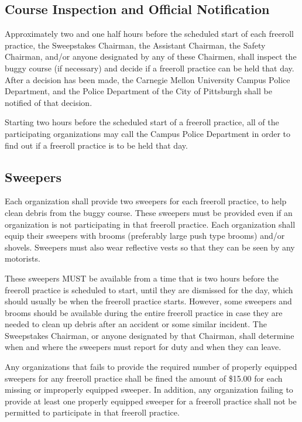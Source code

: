 \subsection{Course Inspection and Official Notification}

Approximately two and one half hours before the scheduled start of each freeroll practice, the Sweepstakes Chairman, the Assistant Chairman, the Safety Chairman, and/or anyone designated by any of these Chairmen, shall inspect the buggy course (if necessary) and decide if a freeroll practice can be held that day. After a decision has been made, the Carnegie Mellon University Campus Police Department, and the Police Department of the City of Pittsburgh shall be notified of that decision.

Starting two hours before the scheduled start of a freeroll practice, all of the participating organizations may call the Campus Police Department in order to find out if a freeroll practice is to be held that day.

\subsection{Sweepers}

Each organization shall provide two sweepers for each freeroll practice, to help clean debris from the buggy course. These sweepers must be provided even if an organization is not participating in that freeroll practice. Each organization shall equip their sweepers with brooms (preferably large push type brooms) and/or shovels. Sweepers must also wear reflective vests so that they can be seen by any motorists.

These sweepers MUST be available from a time that is two hours before the freeroll practice is scheduled to start, until they are dismissed for the day, which should usually be when the freeroll practice starts. However, some sweepers and brooms should be available during the entire freeroll practice in case they are needed to clean up debris after an accident or some similar incident. The Sweepstakes Chairman, or anyone designated by that Chairman, shall determine when and where the sweepers must report for duty and when they can leave.

Any organizations that fails to provide the required number of properly equipped sweepers for any freeroll practice shall be fined the amount of \$15.00 for each missing or improperly equipped sweeper. In addition, any organization failing to provide at least one properly equipped sweeper for a freeroll practice shall not be permitted to participate in that freeroll practice.

